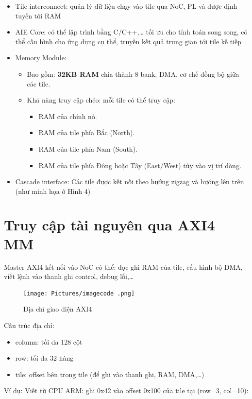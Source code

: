 \begin{itemize}
    \item Tile interconnect: quản lý dữ liệu chạy vào tile qua NoC, PL và được định tuyến tới RAM

    \item AIE Core: có thể lập trình bằng C/C++,… tối ưu cho tính toán song song, có thể cấu hình cho ứng dụng cụ thể, truyền kết quả trung gian tới tile kế tiếp

    \item Memory Module:
    \begin{itemize}
        \item Bao gồm: \textbf{32KB RAM} chia thành 8 bank, DMA, cơ chế đồng bộ giữa các tile.
        \item Khả năng truy cập chéo: mỗi tile có thể truy cập:
        \begin{itemize}
            \item RAM của chính nó.
            \item RAM của tile phía Bắc (North).
            \item RAM của tile phía Nam (South).
            \item RAM của tile phía Đông hoặc Tây (East/West) tùy vào vị trí dòng.
        \end{itemize}
    \end{itemize}

    \item Cascade interface: Các tile được kết nối theo hướng zigzag và hướng lên trên (như minh họa ở Hình 4)
\end{itemize}

\section{Truy cập tài nguyên qua AXI4 MM}

Master AXI4 kết nối vào NoC có thể: đọc ghi RAM của tile, cấu hình bộ DMA, viết lệnh vào thanh ghi control, debug lỗi,…
\begin{figure}[H]
    \centering
    \texttt{[image: Pictures/imagecode .png]}
    \caption{Địa chỉ giao diện AXI4}
\end{figure}
Cấu trúc địa chỉ: \begin{itemize}
    \item column: tối đa 128 cột
    \item row: tối đa 32 hàng 
    \item tile: offset bên trong tile (để ghi vào thanh ghi, RAM, DMA,…)
\end{itemize}
Ví dụ: Viết từ CPU ARM: ghi 0x42 vào offset 0x100 của tile tại (row=3, col=10): 

